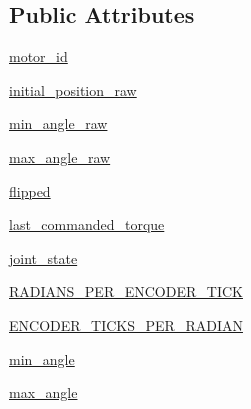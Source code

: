 \subsection*{Public Attributes}
\begin{DoxyCompactItemize}
\item 
\hyperlink{classdynamixel__controllers_1_1joint__torque__controller_1_1_joint_torque_controller_aaf89ba30f80be70baee00bc53054e1d9}{motor\+\_\+id}
\item 
\hyperlink{classdynamixel__controllers_1_1joint__torque__controller_1_1_joint_torque_controller_ad24688a323847dd322cbedb657932738}{initial\+\_\+position\+\_\+raw}
\item 
\hyperlink{classdynamixel__controllers_1_1joint__torque__controller_1_1_joint_torque_controller_a3d5f742296a972f479cd51829125b6fc}{min\+\_\+angle\+\_\+raw}
\item 
\hyperlink{classdynamixel__controllers_1_1joint__torque__controller_1_1_joint_torque_controller_aaf6697b3ba6ea3574f15e93b78cd40eb}{max\+\_\+angle\+\_\+raw}
\item 
\hyperlink{classdynamixel__controllers_1_1joint__torque__controller_1_1_joint_torque_controller_a172d6e36ab7a230fb6dd5227bcb303d8}{flipped}
\item 
\hyperlink{classdynamixel__controllers_1_1joint__torque__controller_1_1_joint_torque_controller_abe5e0bb1146f3b4a6ba91f1ae865d5b2}{last\+\_\+commanded\+\_\+torque}
\item 
\hyperlink{classdynamixel__controllers_1_1joint__torque__controller_1_1_joint_torque_controller_a9a11cd15ce5552b2b6da1f28ce702b59}{joint\+\_\+state}
\item 
\hyperlink{classdynamixel__controllers_1_1joint__torque__controller_1_1_joint_torque_controller_a1153ce56c993d9fc99fae7e99b725049}{R\+A\+D\+I\+A\+N\+S\+\_\+\+P\+E\+R\+\_\+\+E\+N\+C\+O\+D\+E\+R\+\_\+\+T\+I\+CK}
\item 
\hyperlink{classdynamixel__controllers_1_1joint__torque__controller_1_1_joint_torque_controller_a1abc58b325b591bdd8ba0355b80d90b7}{E\+N\+C\+O\+D\+E\+R\+\_\+\+T\+I\+C\+K\+S\+\_\+\+P\+E\+R\+\_\+\+R\+A\+D\+I\+AN}
\item 
\hyperlink{classdynamixel__controllers_1_1joint__torque__controller_1_1_joint_torque_controller_aa079081c5319b82d96deda6148337be9}{min\+\_\+angle}
\item 
\hyperlink{classdynamixel__controllers_1_1joint__torque__controller_1_1_joint_torque_controller_a60b61017f07107eee0fe1c8c49a60f59}{max\+\_\+angle}
\item 

\end{DoxyCompactItemize}

